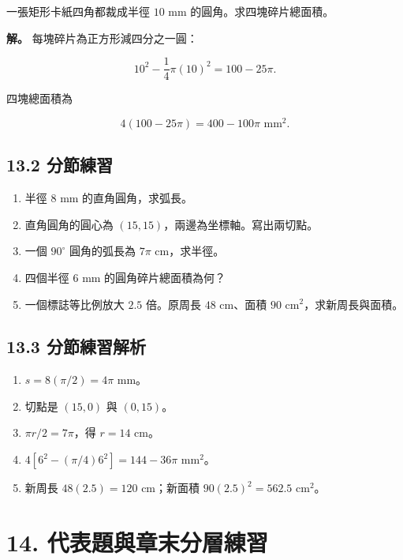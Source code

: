 \documentclass[11pt,a4paper]{article}
\providecommand{\tightlist}{%
  \setlength{\itemsep}{0pt}\setlength{\parskip}{0pt}}
\begin{document}
一張矩形卡紙四角都裁成半徑 \(10\text{ mm}\) 的圓角。求四塊碎片總面積。

\textbf{解。} 每塊碎片為正方形減四分之一圓：

\[
10^2-\frac14\pi(10)^2=100-25\pi.
\]

四塊總面積為

\[
4(100-25\pi)=400-100\pi\text{ mm}^2.
\]

\subsection{13.2 分節練習}\label{ux5206ux7bc0ux7df4ux7fd2-12}

\begin{enumerate}
\def\labelenumi{\arabic{enumi}.}
\tightlist
\item
  半徑 \(8\text{ mm}\) 的直角圓角，求弧長。
\item
  直角圓角的圓心為 \((15,15)\)，兩邊為坐標軸。寫出兩切點。
\item
  一個 \(90^\circ\) 圓角的弧長為 \(7\pi\text{ cm}\)，求半徑。
\item
  四個半徑 \(6\text{ mm}\) 的圓角碎片總面積為何？
\item
  一個標誌等比例放大 \(2.5\) 倍。原周長 \(48\text{ cm}\)、面積 \(90\text{ cm}^2\)，求新周長與面積。
\end{enumerate}

\subsection{13.3 分節練習解析}\label{ux5206ux7bc0ux7df4ux7fd2ux89e3ux6790-12}

\begin{enumerate}
\def\labelenumi{\arabic{enumi}.}
\tightlist
\item
  \(s=8(\pi/2)=4\pi\text{ mm}\)。
\item
  切點是 \((15,0)\) 與 \((0,15)\)。
\item
  \(\pi r/2=7\pi\)，得 \(r=14\text{ cm}\)。
\item
  \(4[6^2-(\pi/4)6^2]=144-36\pi\text{ mm}^2\)。
\item
  新周長 \(48(2.5)=120\text{ cm}\)；新面積 \(90(2.5)^2=562.5\text{ cm}^2\)。
\end{enumerate}

\section{14. 代表題與章末分層練習}\label{ux4ee3ux8868ux984cux8207ux7ae0ux672bux5206ux5c64ux7df4ux7fd2}
\end{document}
